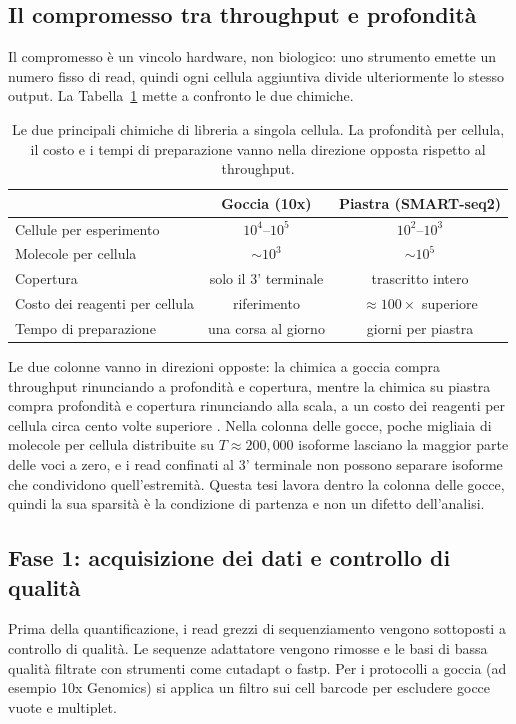 \subsection{Il compromesso tra throughput e profondità}

Il compromesso è un vincolo hardware, non biologico: uno strumento emette un numero fisso di read, quindi ogni cellula aggiuntiva divide ulteriormente lo stesso output. La Tabella~\ref{tab:protocolli} mette a confronto le due chimiche.

\begin{table}[h]
\centering
\small
\caption{Le due principali chimiche di libreria a singola cellula. La profondità per cellula, il costo e i tempi di preparazione vanno nella direzione opposta rispetto al throughput.}\label{tab:protocolli}
\begin{tabular}{lcc}
\toprule
 & \textbf{Goccia (10x)} & \textbf{Piastra (SMART-seq2)} \\
\midrule
Cellule per esperimento & $10^{4}$--$10^{5}$ & $10^{2}$--$10^{3}$ \\
Molecole per cellula & $\sim 10^{3}$ & $\sim 10^{5}$ \\
Copertura & solo il 3' terminale & trascritto intero \\
Costo dei reagenti per cellula & riferimento & $\approx 100\times$ superiore \\
Tempo di preparazione & una corsa al giorno & giorni per piastra \\
\bottomrule
\end{tabular}
\end{table}

Le due colonne vanno in direzioni opposte: la chimica a goccia compra throughput rinunciando a profondità e copertura, mentre la chimica su piastra compra profondità e copertura rinunciando alla scala, a un costo dei reagenti per cellula circa cento volte superiore \cite{conte2024opportunities}. Nella colonna delle gocce, poche migliaia di molecole per cellula distribuite su $T \approx 200{,}000$ isoforme lasciano la maggior parte delle voci a zero, e i read confinati al 3' terminale non possono separare isoforme che condividono quell'estremità. Questa tesi lavora dentro la colonna delle gocce, quindi la sua sparsità è la condizione di partenza e non un difetto dell'analisi.

\subsection{Fase 1: acquisizione dei dati e controllo di qualità}
Prima della quantificazione, i read grezzi di sequenziamento vengono sottoposti a controllo di qualità. Le sequenze adattatore vengono rimosse e le basi di bassa qualità filtrate con strumenti come cutadapt o fastp. Per i protocolli a goccia (ad esempio 10x Genomics) si applica un filtro sui cell barcode per escludere gocce vuote e multiplet.

